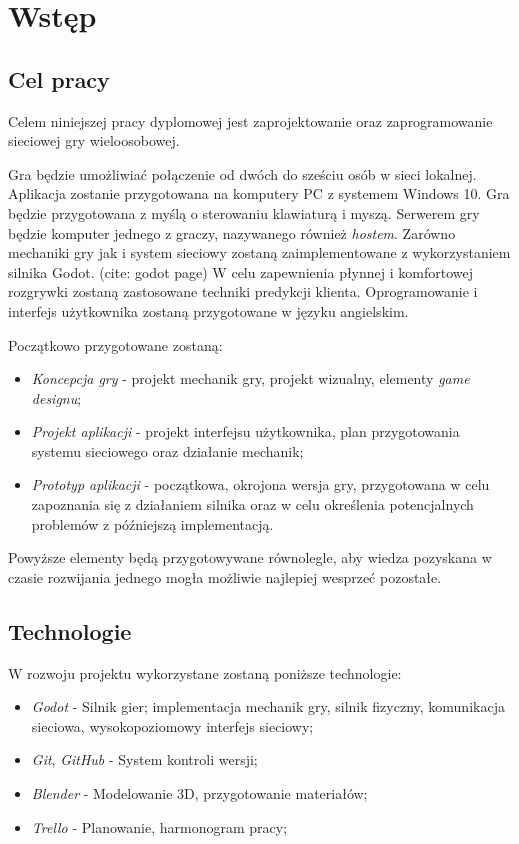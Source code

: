 \chapter*{Wstęp}
\section*{Cel pracy}

Celem niniejszej pracy dyplomowej jest zaprojektowanie oraz zaprogramowanie sieciowej gry wieloosobowej.

Gra będzie umożliwiać połączenie od dwóch do sześciu osób w sieci lokalnej. Aplikacja zostanie przygotowana na komputery PC z systemem Windows 10. Gra będzie przygotowana z myślą o sterowaniu klawiaturą i myszą.
Serwerem gry będzie komputer jednego z graczy, nazywanego również \emph{hostem}.
Zarówno mechaniki gry jak i system sieciowy zostaną zaimplementowane z wykorzystaniem silnika Godot. (cite: godot page)
W celu zapewnienia płynnej i komfortowej rozgrywki zostaną zastosowane techniki predykcji klienta.
Oprogramowanie i interfejs użytkownika zostaną przygotowane w języku angielskim.

Początkowo przygotowane zostaną:
\begin{itemize}
    \item \emph{Koncepcja gry} - projekt mechanik gry, projekt wizualny, elementy \emph{game designu};
    \item \emph{Projekt aplikacji} - projekt interfejsu użytkownika, plan przygotowania systemu sieciowego oraz działanie mechanik;
    \item \emph{Prototyp aplikacji} - początkowa, okrojona wersja gry, przygotowana w celu zapoznania się z działaniem silnika oraz w celu określenia potencjalnych problemów z późniejszą implementacją. 
\end{itemize}

Powyższe elementy będą przygotowywane równolegle, aby wiedza pozyskana w czasie rozwijania jednego mogła możliwie najlepiej wesprzeć pozostałe.

\section*{Technologie}
W rozwoju projektu wykorzystane zostaną poniższe technologie:
\begin{itemize}
    \item \emph{Godot} - Silnik gier; implementacja mechanik gry, silnik fizyczny, komunikacja sieciowa, wysokopoziomowy interfejs sieciowy;
    \item \emph{Git}, \emph{GitHub} - System kontroli wersji;
    \item \emph{Blender} - Modelowanie 3D, przygotowanie materiałów;
    \item \emph{Trello} - Planowanie, harmonogram pracy;
\end{itemize}